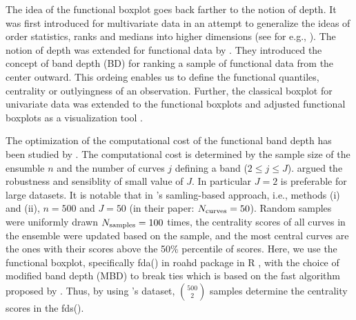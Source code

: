 \documentclass[12pt]{article}
\newcommand{\pkg}[1]{\textsf{#1}}  %
\theoremstyle{definition} %
\begin{document}
The idea of the functional boxplot goes back farther to the notion of depth. It was first introduced for multivariate data in an attempt to generalize the ideas of order statistics, ranks and medians into higher dimensions (see for e.g., \cite{mahalanobis1936generalized,tukey1975mathematics}). The notion of depth was extended for functional data by \citep{lopez2009concept}. They introduced the concept of band depth (BD) for ranking a sample of functional data from the center outward. This ordeing enables us to define the functional quantiles, centrality or outlyingness of an observation. Further, the classical boxplot for univariate data was extended to the functional boxplots and adjusted functional boxplots as a visualization tool \citep{sun2011functional,sun2012adjusted}. 

The optimization of the computational cost of the functional band depth has been studied by \citep{sun2012exact}. The computational cost is determined by the sample size of the ensumble $n$ and the number of curves $j$ defining a band ($2\leq j \leq J$). \cite{sun2012exact} argued the robustness and sensiblity of  small value of $J$. In particular $J=2$ is preferable for large datasets. It is notable that in \cite{juul2021fixed}'s samling-based approach, i.e., methods (i) and (ii), $n=500$ and $J=50$ (in their paper: $N_{\rm{curves}}=50$). Random samples were uniformly drawn $N_{\rm{samples}}=100$ times, the centrality scores of all curves in the ensemble were updated based on the sample, and the most central curves are the ones with their scores above the 50\% percentile of scores. Here, we use the functional boxplot, specifically fda() in \pkg{roahd} package \citep{roahd} in R \citep{R}, with the choice of modified band depth (MBD) to break ties which is based on the fast algorithm proposed by \cite{sun2012exact}. Thus, by using \cite{juul2021fixed}'s dataset, ${500}\choose{2}$ samples determine the centrality scores in the fds().
\end{document}
